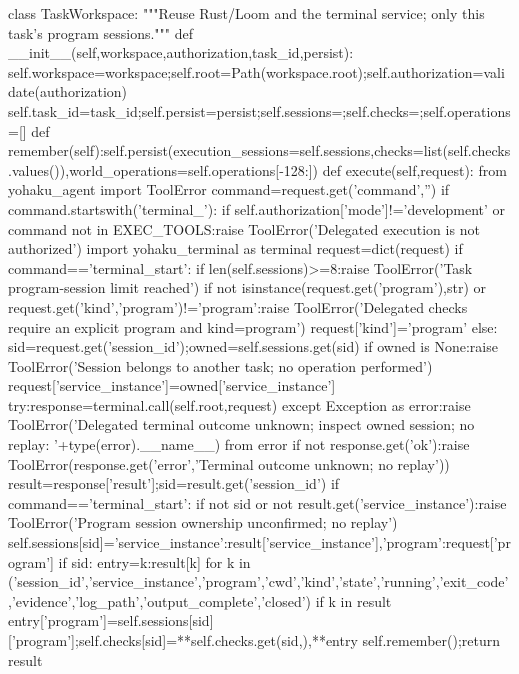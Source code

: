 class TaskWorkspace:
    """Reuse Rust/Loom and the terminal service; only this task's program sessions."""
    def __init__(self,workspace,authorization,task_id,persist):
        self.workspace=workspace;self.root=Path(workspace.root);self.authorization=validate(authorization)
        self.task_id=task_id;self.persist=persist;self.sessions={};self.checks={};self.operations=[]
    def remember(self):self.persist(execution_sessions=self.sessions,checks=list(self.checks.values()),world_operations=self.operations[-128:])
    def execute(self,request):
        from yohaku_agent import ToolError
        command=request.get('command','')
        if command.startswith('terminal_'):
            if self.authorization['mode']!='development' or command not in EXEC_TOOLS:raise ToolError('Delegated execution is not authorized')
            import yohaku_terminal as terminal
            request=dict(request)
            if command=='terminal_start':
                if len(self.sessions)>=8:raise ToolError('Task program-session limit reached')
                if not isinstance(request.get('program'),str) or request.get('kind','program')!='program':raise ToolError('Delegated checks require an explicit program and kind=program')
                request['kind']='program'
            else:
                sid=request.get('session_id');owned=self.sessions.get(sid)
                if owned is None:raise ToolError('Session belongs to another task; no operation performed')
                request['service_instance']=owned['service_instance']
            try:response=terminal.call(self.root,request)
            except Exception as error:raise ToolError('Delegated terminal outcome unknown; inspect owned session; no replay: '+type(error).__name__) from error
            if not response.get('ok'):raise ToolError(response.get('error','Terminal outcome unknown; no replay'))
            result=response['result'];sid=result.get('session_id')
            if command=='terminal_start':
                if not sid or not result.get('service_instance'):raise ToolError('Program session ownership unconfirmed; no replay')
                self.sessions[sid]={'service_instance':result['service_instance'],'program':request['program']}
            if sid:
                entry={k:result[k] for k in ('session_id','service_instance','program','cwd','kind','state','running','exit_code','evidence','log_path','output_complete','closed') if k in result}
                entry['program']=self.sessions[sid]['program'];self.checks[sid]={**self.checks.get(sid,{}),**entry}
            self.remember();return result
